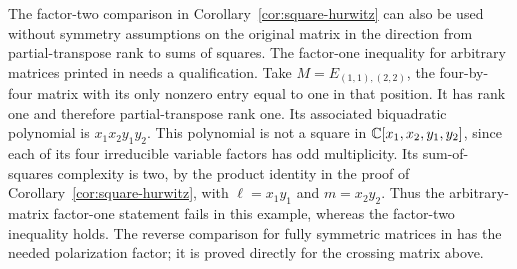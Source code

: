 The factor-two comparison in Corollary~\ref{cor:square-hurwitz}
can also be used without symmetry assumptions on the original
matrix in the direction from partial-transpose rank to sums of
squares. The factor-one inequality for arbitrary matrices printed
in \cite[Lemma~3.12, p.~113:9]{RossmanZhu2026} needs a qualification.
Take $M=E_{(1,1),(2,2)}$, the four-by-four matrix with its only
nonzero entry equal to one in that position. It has rank one
and therefore partial-transpose rank one. Its associated
biquadratic polynomial is $x_1x_2y_1y_2$.
This polynomial is not a square in
$\mathbb C[x_1,x_2,y_1,y_2]$, since each of its four irreducible
variable factors has odd multiplicity. Its sum-of-squares
complexity is two, by the product identity in the proof of
Corollary~\ref{cor:square-hurwitz}, with
$\ell=x_1y_1$ and $m=x_2y_2$.
Thus the arbitrary-matrix factor-one statement fails in this
example, whereas the factor-two inequality holds.
The reverse comparison for fully symmetric matrices in
\cite[Lemma~3.14, p.~113:10]{RossmanZhu2026} has the needed
polarization factor; it is proved directly for the crossing
matrix above.
